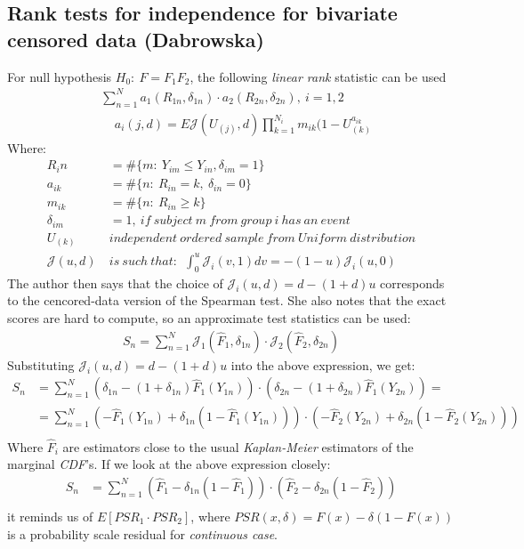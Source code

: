 \documentclass[]{article}
\begin{document}
\subsection{Rank tests for independence for bivariate censored data (Dabrowska) \cite{dabrowska1986rank}}
For null hypothesis $H_0:~F=F_1 F_2$, the following \emph{linear rank} statistic can be used
	$$
	\begin{aligned}
		 &\sum_{n=1}^N a_1(R_{1n}, \delta_{1n})\cdot a_2(R_{2n}, \delta_{2n}), ~i=1,2\\
		 &~~~~~ a_i(j,d) = E\mathcal{J}(U_{(j)}, d)\prod_{k=1}^{N_i} m_{ik}(1-U_{(k)}^{a_{ik}}
	\end{aligned}
	$$
Where: 
	$$
	\begin{aligned}
		 R_in &= \#\{m:~Y_{im} \leq Y_{in}, \delta_{im}=1   \}\\
		 a_{ik} &= \# \{n: ~R_{in}=k,~\delta_{in}=0\}\\
		 m_{ik} &= \# \{n: ~R_{in}\geq k\}\\
		 \delta_{im}&=1,~if~subject ~m~from~group~i~has~an~event\\
		 U_{(k)}~&independent ~ordered~sample~from~Uniform~distribution\\
		 \mathcal{J}(u,d) ~&is~such~that:~~\int_0^u \mathcal{J}_i(v,1)dv = -(1-u)\mathcal{J}_i(u,0)
	\end{aligned}
	$$
The author then says that the choice of $\mathcal{J}_i(u,d) =d-(1+d)u$ corresponds to the cencored-data version of the Spearman test. She also notes that the exact scores are hard to compute, so an approximate test statistics  can be used:
	$$
	\begin{aligned}
		 S_n = \sum_{n=1}^N \mathcal{J}_1( \hat{F}_1, \delta_{1n}) \cdot \mathcal{J}_2( \hat{F}_2, \delta_{2n})
	\end{aligned}
	$$
Substituting $\mathcal{J}_i(u,d) =d-(1+d)u$ into the above expression, we get:
	$$
	\begin{aligned}
		 S_n &= \sum_{n=1}^N (\delta_{1n} - (1+\delta_{1n})\hat{F}_1(Y_{1n}))\cdot (\delta_{2n} - (1+\delta_{2n})\hat{F}_1(Y_{2n})) =\\
		 &= \sum_{n=1}^N (-\hat{F}_1(Y_{1n}) + \delta_{1n}(1-\hat{F}_1(Y_{1n})))\cdot (-\hat{F}_2(Y_{2n}) + \delta_{2n}(1-\hat{F}_2(Y_{2n})))\\
	\end{aligned}
	$$
Where $\hat{F}_i$ are estimators close to the usual \emph{Kaplan-Meier} estimators of the marginal \emph{CDF}'s. If we look at the above expression closely:
	$$
	\begin{aligned}
		 S_n &= \sum_{n=1}^N (\hat{F}_1 - \delta_{1n}(1-\hat{F}_1))\cdot (\hat{F}_2 - \delta_{2n}(1-\hat{F}_2))\\
	\end{aligned}
	$$
it reminds us of $E[PSR_1 \cdot PSR_2]$, where $PSR(x, \delta) = F(x)-\delta(1-F(x))$ is a probability scale residual for \emph{continuous case}.
\end{document}
